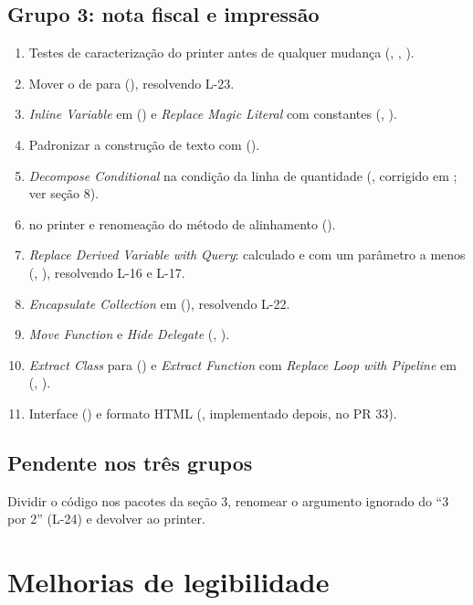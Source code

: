 \subsection{Grupo 3: nota fiscal e impressão}
\begin{enumerate}
\item Testes de caracterização do printer antes de qualquer mudança (, , ).
\item Mover o  de  para  (), resolvendo L-23.
\item \textit{Inline Variable} em  () e \textit{Replace Magic Literal} com constantes (, ).
\item Padronizar a construção de texto com  ().
\item \textit{Decompose Conditional} na condição da linha de quantidade (, corrigido em ; ver seção 8).
\item {} no printer e renomeação do método de alinhamento ().
\item \textit{Replace Derived Variable with Query}:  calculado e  com um parâmetro a menos (, ), resolvendo L-16 e L-17.
\item \textit{Encapsulate Collection} em  (), resolvendo L-22.
\item \textit{Move Function} e \textit{Hide Delegate} (, ).
\item \textit{Extract Class} para  () e \textit{Extract Function} com \textit{Replace Loop with Pipeline} em  (, ).
\item Interface  () e formato HTML (, implementado depois, no PR 33).
\end{enumerate}

\subsection{Pendente nos três grupos}
Dividir o código nos pacotes da seção 3, renomear o argumento ignorado do ``3 por 2'' (L-24) e devolver  ao printer.

\section{Melhorias de legibilidade}


